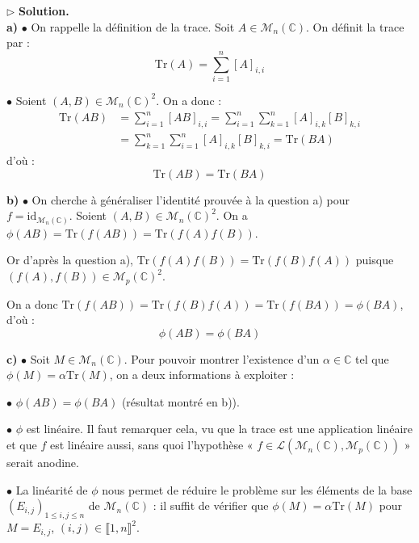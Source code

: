 \documentclass[11pt,a4paper]{report}
\begin{document}
\vspace{0.4cm}

\noindent $\triangleright$ \textbf{Solution.} \\

\noindent \textbf{a)} $\bullet$ On rappelle la définition de la trace. Soit $A \in \mathcal{M}_n(\mathbb{C})$. On définit la trace par :
$$ \boxed{\mathrm{Tr}(A) = \sum_{i=1}^n [A]_{i,i}} $$

\noindent $\bullet$ Soient $(A,B) \in \mathcal{M}_n(\mathbb{C})^2$. On a donc :
\begin{align*}
\mathrm{Tr}(AB) &= \sum_{i=1}^n [AB]_{i,i} = \sum_{i=1}^n \sum_{k=1}^n [A]_{i,k} [B]_{k,i} \\
&= \sum_{k=1}^n \sum_{i=1}^n [A]_{i,k} [B]_{k,i} = \mathrm{Tr}(BA)
\end{align*}
\noindent d'où :
$$ \boxed{\mathrm{Tr}(AB) = \mathrm{Tr}(BA)} $$
\vspace{0.5cm}

\noindent \textbf{b)} $\bullet$ On cherche à généraliser l'identité prouvée à la question a) pour $f = \mathrm{id}_{\mathcal{M}_n(\mathbb{C})}$. Soient $(A,B) \in \mathcal{M}_n(\mathbb{C})^2$. On a $\phi(AB) = \mathrm{Tr}(f(AB)) = \mathrm{Tr}(f(A)f(B))$.

\noindent Or d'après la question a), $\mathrm{Tr}(f(A)f(B)) = \mathrm{Tr}(f(B)f(A))$ puisque $(f(A), f(B)) \in \mathcal{M}_p(\mathbb{C})^2$.

\noindent On a donc $\mathrm{Tr}(f(AB)) = \mathrm{Tr}(f(B)f(A)) = \mathrm{Tr}(f(BA)) = \phi(BA)$, d'où :
$$ \boxed{\phi(AB) = \phi(BA)} $$
\vspace{0.5cm}

\noindent \textbf{c)} $\bullet$ Soit $M \in \mathcal{M}_n(\mathbb{C})$. Pour pouvoir montrer l'existence d'un $\alpha \in \mathbb{C}$ tel que $\phi(M) = \alpha \mathrm{Tr}(M)$, on a deux informations à exploiter :

\noindent $\bullet$ $\phi(AB) = \phi(BA)$ (résultat montré en b)).

\noindent $\bullet$ $\phi$ est linéaire. Il faut remarquer cela, vu que la trace est une application linéaire et que $f$ est linéaire aussi, sans quoi l'hypothèse « $f \in \mathcal{L}(\mathcal{M}_n(\mathbb{C}), \mathcal{M}_p(\mathbb{C}))$ » serait anodine.

\noindent $\bullet$ La linéarité de $\phi$ nous permet de réduire le problème sur les éléments de la base $(E_{i,j})_{1 \leqslant i,j \leqslant n}$ de $\mathcal{M}_n(\mathbb{C})$ : il suffit de vérifier que $\phi(M) = \alpha \mathrm{Tr}(M)$ pour $M = E_{i,j}$, $(i,j) \in \llbracket 1,n \rrbracket^2$.
\end{document}
